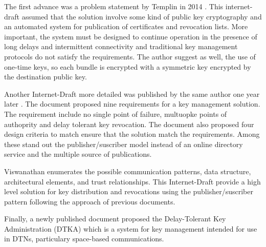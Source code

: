 The first advance was a problem statement by Templin in 2014  \cite{templin-dtnskmps-00}. This internet-draft assumed that the solution involve some kind of public key cryptography and an automated system for publication of certificates and revocation lists. More important, the system must be designed to continue operation in the presence of long delays and intermittent connectivity and traditional key management protocols do not satisfy the requirements. The author suggest as well, the use of one-time keys, so each bundle is encrypted with a symmetric key encrypted by the destination public key. 

Another Internet-Draft more detailed was published by the same author one year later \cite{templin-dtnskmreq-00}. The document proposed nine requirements for a key management solution. The requirement include no single point of failure, multuopke points of authoprity and delay tolerant key revocation. The document also proposed four design criteria to match ensure that the solution match the requirements. Among these stand out the publisher/suscriber model instead of an online directory service and the multiple source of publications. 

Viswanathan \cite{viswanathan-dtn-pkdn-00} enumerates the possible communication patterns, data structure, architectural elements, and trust relationships.  This Internet-Draft provide a high level solution for key distribution and revocations using the publisher/suscriber pattern following the approach of previous documents.

Finally, a newly published document proposed the Delay-Tolerant Key Administration (DTKA) which is a system for key management intended for use in DTNs, particulary space-based communications. 









